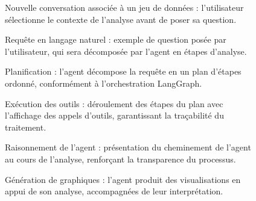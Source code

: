 \begin{figure}[H]
\centering
{}
\caption{Nouvelle conversation associée à un jeu de données : l'utilisateur sélectionne le contexte de l'analyse avant de poser sa question.}
\label{fig:annexe-conversation-dataset}
\end{figure}

\begin{figure}[H]
\centering
{}
\caption{Requête en langage naturel : exemple de question posée par l'utilisateur, qui sera décomposée par l'agent en étapes d'analyse.}
\label{fig:annexe-simple-prompt}
\end{figure}

\begin{figure}[H]
\centering
{}
\caption{Planification : l'agent décompose la requête en un plan d'étapes ordonné, conformément à l'orchestration LangGraph.}
\label{fig:annexe-agent-planning}
\end{figure}

\begin{figure}[H]
\centering
{}
\caption{Exécution des outils : déroulement des étapes du plan avec l'affichage des appels d'outils, garantissant la traçabilité du traitement.}
\label{fig:annexe-tools-execution}
\end{figure}

\begin{figure}[H]
\centering
{}
\caption{Raisonnement de l'agent : présentation du cheminement de l'agent au cours de l'analyse, renforçant la transparence du processus.}
\label{fig:annexe-agent-reasoning}
\end{figure}

\begin{figure}[H]
\centering
{}
\caption{Génération de graphiques : l'agent produit des visualisations en appui de son analyse, accompagnées de leur interprétation.}
\label{fig:annexe-generate-graph}
\end{figure}

